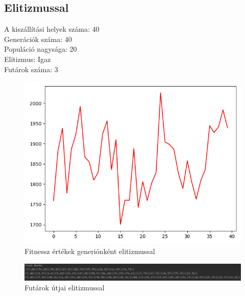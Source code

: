 \subsection{
Elitizmussal
}

A kiszállítási helyek száma: 40\\
Generációk száma: 40\\
Populáció nagysága: 20\\
Elitizmus: Igaz\\
Futárok száma: 3\\

\begin{figure}[!htb]
\centering
\includegraphics[scale=0.7]{images/MTSPMultiDepo2.png}
\caption{Fitnessz értékek generiónként elitizmussal}
\label{fig:MTSPMultiDepo2}
\end{figure}

\begin{figure}[!htb]
\centering
\includegraphics[width=\textwidth]{images/MTSPMultiDepo2Route.png}
\caption{Futárok útjai elitizmussal}
\label{fig:MTSPMultiDepo2Route}
\end{figure}
